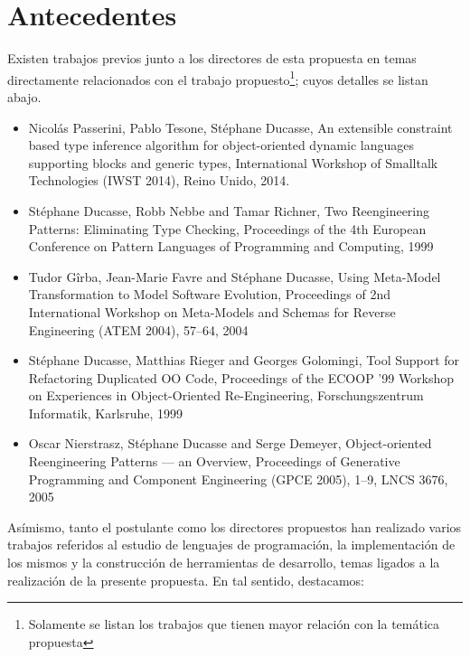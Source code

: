 \documentclass[a4paper,10pt]{article}
\begin{document}
\section{Antecedentes}

Existen trabajos previos junto a los directores de esta propuesta en temas directamente relacionados con el trabajo propuesto\footnote{Solamente se listan los trabajos que tienen mayor relación con la temática propuesta}; cuyos detalles se listan abajo.

\begin{itemize}
 \item Nicolás Passerini, Pablo Tesone, Stéphane Ducasse, An extensible constraint based type inference
algorithm for object-oriented dynamic languages supporting blocks and generic types, International Workshop of Smalltalk Technologies (IWST 2014), Reino Unido, 2014.
 
 \item Stéphane Ducasse, Robb Nebbe and Tamar Richner, Two Reengineering Patterns: Eliminating Type Checking, Proceedings of the 4th European Conference on Pattern Languages of Programming and Computing, 1999
 
 \item Tudor Gîrba, Jean-Marie Favre and Stéphane Ducasse, Using Meta-Model Transformation to Model Software Evolution, Proceedings of 2nd International Workshop on Meta-Models and Schemas for Reverse Engineering (ATEM 2004), 57–64, 2004
 
 \item Stéphane Ducasse, Matthias Rieger and Georges Golomingi, Tool Support for Refactoring Duplicated OO Code, Proceedings of the ECOOP '99 Workshop on Experiences in Object-Oriented Re-Engineering, Forschungszentrum Informatik, Karlsruhe, 1999
 
 \item Oscar Nierstrasz, Stéphane Ducasse and Serge Demeyer, Object-oriented Reengineering Patterns — an Overview, Proceedings of Generative Programming and Component Engineering (GPCE 2005), 1–9, LNCS 3676, 2005
 
\end{itemize}

Asímismo, tanto el postulante como los directores propuestos han realizado varios trabajos referidos al estudio de lenguajes de programación, la implementación de los mismos y la construcción de herramientas de desarrollo, temas ligados a la realización de la presente propuesta. En tal sentido, destacamos:
\end{document}
